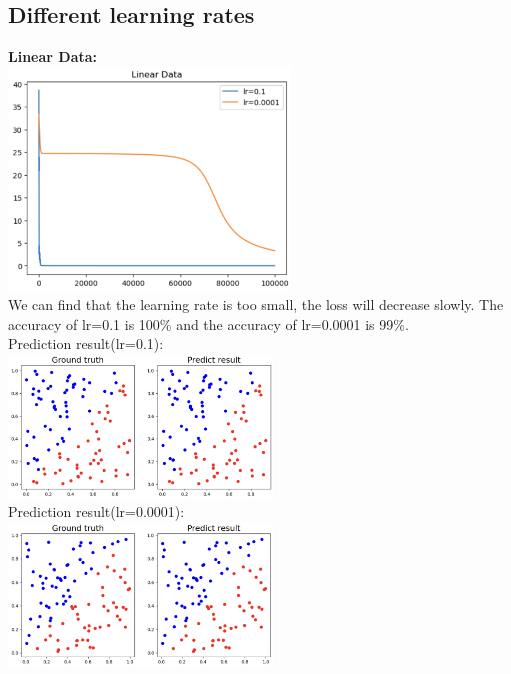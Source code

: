 \documentclass{article} %
\begin{document}
    \subsection{Different learning rates}
    \textbf{Linear Data:} \\
    \includegraphics[width=7.5cm]{./imgs/linear_loss_cmp.png} \\
    We can find that the learning rate is too small, the loss will decrease slowly. The accuracy of lr=0.1 is 100\% and the accuracy
    of lr=0.0001 is 99\%. \\
    Prediction result(lr=0.1): \\
    \includegraphics[width=7cm]{./imgs/linear_lr0.1.png} \\
    Prediction result(lr=0.0001): \\
    \includegraphics[width=7cm]{./imgs/linear_lr0.0001.png} \\
\end{document}
